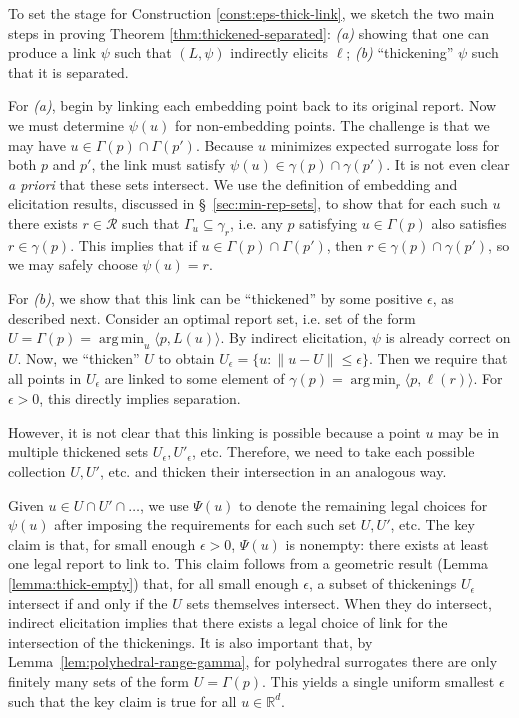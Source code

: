 \documentclass[11pt]{article}
\newcommand{\reals}{\mathbb{R}}
\newcommand{\R}{\mathcal{R}}
\newcommand{\inprod}[2]{\langle #1, #2 \rangle}%
\DeclareMathOperator*{\argmin}{arg\,min}
\begin{document}
To set the stage for Construction \ref{const:eps-thick-link}, we sketch the two main steps in proving Theorem \ref{thm:thickened-separated}: \emph{(a)} showing that one can produce a link $\psi$ such that $(L,\psi)$ indirectly elicits $\ell$; \emph{(b)} ``thickening'' $\psi$ such that it is separated.

For \emph{(a)}, begin by linking each embedding point back to its original report.
Now we must determine $\psi(u)$ for non-embedding points.
The challenge is that we may have $u \in \Gamma(p) \cap \Gamma(p')$.
Because $u$ minimizes expected surrogate loss for both $p$ and $p'$, the link must satisfy $\psi(u) \in \gamma(p) \cap \gamma(p')$.
It is not even clear \emph{a priori} that these sets intersect.
We use the definition of embedding and elicitation results, discussed in \S~\ref{sec:min-rep-sets}, to show that for each such $u$ there exists $r \in \R$ such that $\Gamma_u \subseteq \gamma_r$, i.e. any $p$ satisfying $u \in \Gamma(p)$ also satisfies $r \in \gamma(p)$.
This implies that if $u \in \Gamma(p) \cap \Gamma(p')$, then $r \in \gamma(p) \cap \gamma(p')$, so we may safely choose $\psi(u) = r$.

For \emph{(b)}, we show that this link can be ``thickened'' by some positive $\epsilon$, as described next.
Consider an optimal report set, i.e. set of the form $U = \Gamma(p) = \argmin_u \inprod{p}{L(u)}$.
By indirect elicitation, $\psi$ is already correct on $U$.
Now, we ``thicken'' $U$ to obtain $U_{\epsilon} = \{u : \|u - U\| \leq \epsilon\}$.
Then we require that all points in $U_{\epsilon}$ are linked to some element of $\gamma(p) = \argmin_r \inprod{p}{\ell(r)}$.
For $\epsilon > 0$, this directly implies separation.

However, it is not clear that this linking is possible because a point $u$ may be in multiple thickened sets $U_{\epsilon}, U'_{\epsilon}$, etc.
Therefore, we need to take each possible collection $U,U'$, etc. and thicken their intersection in an analogous way.

Given $u \in U \cap U' \cap \dots$, we use $\Psi(u)$ to denote the remaining legal choices for $\psi(u)$ after imposing the requirements for each such set $U,U'$, etc.
The key claim is that, for small enough $\epsilon > 0$, $\Psi(u)$ is nonempty: there exists at least one legal report to link to.
This claim follows from a geometric result (Lemma \ref{lemma:thick-empty}) that, for all small enough $\epsilon$, a subset of thickenings $U_{\epsilon}$ intersect if and only if the $U$ sets themselves intersect.
When they do intersect, indirect elicitation implies that there exists a legal choice of link for the intersection of the thickenings.
It is also important that, by Lemma~\ref{lem:polyhedral-range-gamma}, for polyhedral surrogates there are only finitely many sets of the form $U = \Gamma(p)$.
This yields a single uniform smallest $\epsilon$ such that the key claim is true for all $u \in \reals^d$.
\end{document}
